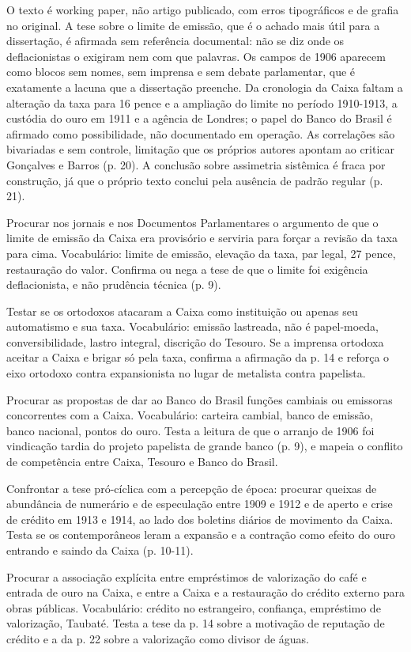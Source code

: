
O texto é working paper, não artigo publicado, com erros tipográficos e de grafia no original. A tese sobre o limite de emissão, que é o achado mais útil para a dissertação, é afirmada sem referência documental: não se diz onde os deflacionistas o exigiram nem com que palavras. Os campos de 1906 aparecem como blocos sem nomes, sem imprensa e sem debate parlamentar, que é exatamente a lacuna que a dissertação preenche. Da cronologia da Caixa faltam a alteração da taxa para 16 pence e a ampliação do limite no período 1910-1913, a custódia do ouro em 1911 e a agência de Londres; o papel do Banco do Brasil é afirmado como possibilidade, não documentado em operação. As correlações são bivariadas e sem controle, limitação que os próprios autores apontam ao criticar Gonçalves e Barros (p. 20). A conclusão sobre assimetria sistêmica é fraca por construção, já que o próprio texto conclui pela ausência de padrão regular (p. 21).

\begin{dialogo}
\item Procurar nos jornais e nos Documentos Parlamentares o argumento de que o limite de emissão da Caixa era provisório e serviria para forçar a revisão da taxa para cima. Vocabulário: limite de emissão, elevação da taxa, par legal, 27 pence, restauração do valor. Confirma ou nega a tese de que o limite foi exigência deflacionista, e não prudência técnica (p. 9).
\item Testar se os ortodoxos atacaram a Caixa como instituição ou apenas seu automatismo e sua taxa. Vocabulário: emissão lastreada, não é papel-moeda, conversibilidade, lastro integral, discrição do Tesouro. Se a imprensa ortodoxa aceitar a Caixa e brigar só pela taxa, confirma a afirmação da p. 14 e reforça o eixo ortodoxo contra expansionista no lugar de metalista contra papelista.
\item Procurar as propostas de dar ao Banco do Brasil funções cambiais ou emissoras concorrentes com a Caixa. Vocabulário: carteira cambial, banco de emissão, banco nacional, pontos do ouro. Testa a leitura de que o arranjo de 1906 foi vindicação tardia do projeto papelista de grande banco (p. 9), e mapeia o conflito de competência entre Caixa, Tesouro e Banco do Brasil.
\item Confrontar a tese pró-cíclica com a percepção de época: procurar queixas de abundância de numerário e de especulação entre 1909 e 1912 e de aperto e crise de crédito em 1913 e 1914, ao lado dos boletins diários de movimento da Caixa. Testa se os contemporâneos leram a expansão e a contração como efeito do ouro entrando e saindo da Caixa (p. 10-11).
\item Procurar a associação explícita entre empréstimos de valorização do café e entrada de ouro na Caixa, e entre a Caixa e a restauração do crédito externo para obras públicas. Vocabulário: crédito no estrangeiro, confiança, empréstimo de valorização, Taubaté. Testa a tese da p. 14 sobre a motivação de reputação de crédito e a da p. 22 sobre a valorização como divisor de águas.
\end{dialogo}

